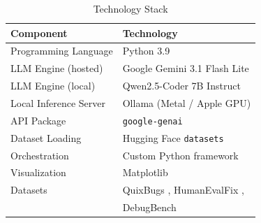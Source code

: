 \documentclass[conference]{IEEEtran}
\begin{document}
\begin{table}[htbp]
\caption{Technology Stack}
\label{tab:techstack}
\centering
\begin{tabular}{ll}
\toprule
\textbf{Component} & \textbf{Technology} \\
\midrule
Programming Language & Python 3.9 \\
LLM Engine (hosted) & Google Gemini 3.1 Flash Lite \\
LLM Engine (local) & Qwen2.5-Coder 7B Instruct \\
Local Inference Server & Ollama (Metal / Apple GPU) \\
API Package & \texttt{google-genai} \\
Dataset Loading & Hugging Face \texttt{datasets} \\
Orchestration & Custom Python framework \\
Visualization & Matplotlib \\
Datasets & QuixBugs \cite{quixbugs}, HumanEvalFix \cite{humanevalpack},\\
& DebugBench \cite{debugbench} \\
\bottomrule
\end{tabular}
\end{table}
\end{document}
